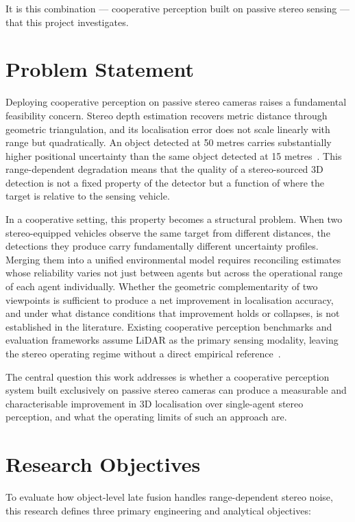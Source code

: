 It is this combination --- cooperative perception built on passive stereo
sensing --- that this project investigates.

\section{Problem Statement}

Deploying cooperative perception on passive stereo cameras raises a fundamental
feasibility concern. Stereo depth estimation recovers metric distance through
geometric triangulation, and its localisation error does not scale linearly with
range but quadratically. An object detected at 50 metres carries substantially
higher positional uncertainty than the same object detected at 15
metres~\cite{huang2025}. This range-dependent degradation means that the quality
of a stereo-sourced 3D detection is not a fixed property of the detector but a
function of where the target is relative to the sensing vehicle.

In a cooperative setting, this property becomes a structural problem. When two
stereo-equipped vehicles observe the same target from different distances, the
detections they produce carry fundamentally different uncertainty profiles.
Merging them into a unified environmental model requires reconciling estimates
whose reliability varies not just between agents but across the operational range
of each agent individually. Whether the geometric complementarity of two
viewpoints is sufficient to produce a net improvement in localisation accuracy,
and under what distance conditions that improvement holds or collapses, is not
established in the literature. Existing cooperative perception benchmarks and
evaluation frameworks assume LiDAR as the primary sensing modality, leaving the
stereo operating regime without a direct empirical
reference~\cite{xu2023v2v4real}.

The central question this work addresses is whether a cooperative perception
system built exclusively on passive stereo cameras can produce a measurable and
characterisable improvement in 3D localisation over single-agent stereo
perception, and what the operating limits of such an approach are.

\section{Research Objectives}

To evaluate how object-level late fusion handles range-dependent stereo noise,
this research defines three primary engineering and analytical objectives:

